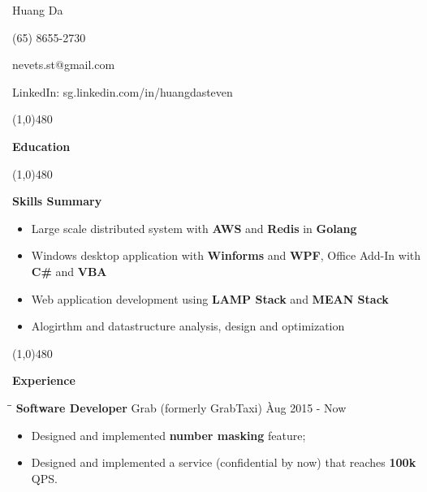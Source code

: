 \documentclass{article}
\begin{document}
\centerline{{\Huge \sc Huang Da} }
\centerline{(65) 8655-2730}
\centerline{nevets.st@gmail.com}
\centerline{LinkedIn: sg.linkedin.com/in/huangdasteven}

\noindent

\centerline{\line(1,0){480}}

\medskip

\centerline {\Large \bf Education}

\smallskip


\centerline{\line(1,0){480}}

\medskip

\centerline {\Large \bf {Skills Summary}}

\vspace{-6pt}\smallskip

\begin{itemize}[leftmargin=*]
  \item Large scale distributed system with {\bf AWS} and {\bf Redis} in {\bf Golang} \vspace{-6pt}
  \item Windows desktop application with {\bf Winforms} and {\bf WPF}, Office Add-In with {\bf C\#}  and {\bf VBA}\vspace{-6pt}
  \item Web application development using {\bf LAMP Stack} and {\bf MEAN Stack} \vspace{-6pt}
  \item Alogirthm and datastructure analysis, design and optimization \vspace{-6pt}
\end{itemize}

\centerline{\line(1,0){480}}

\medskip

\centerline {\Large \bf Experience}

\medskip


\begin{tabbing}
\hspace{2.35in}\= \hspace{2.6in}\= \kill
{\bf Software Developer} \> Grab (formerly GrabTaxi) \`Aug 2015 - Now\
\end{tabbing}

\begin{itemize}
    \item Designed and implemented {\bf number masking} feature; \vspace{-6pt}
    \item Designed and implemented a service (confidential by now) that reaches {\bf 100k} QPS. \vspace{-6pt}
\end{itemize}
\end{document}
